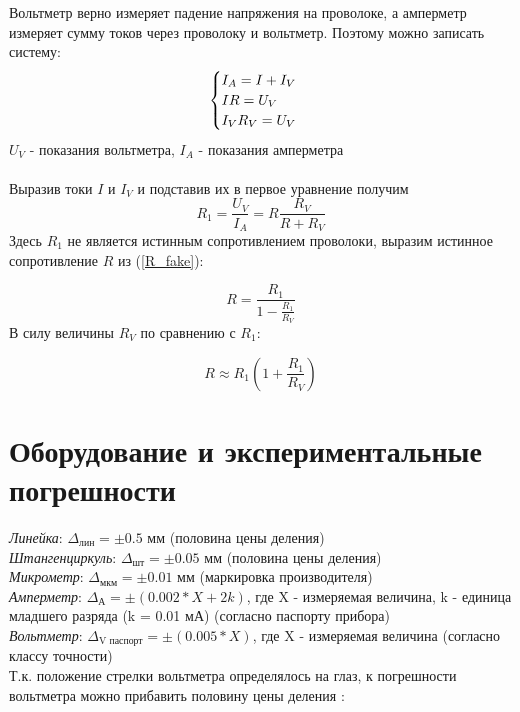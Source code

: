 \documentclass{article}
\begin{document}
	Вольтметр верно измеряет падение напряжения на проволоке, а амперметр измеряет сумму токов через проволоку и вольтметр. Поэтому можно записать систему:\\
	\begin{equation}
		\begin{cases}
			$$ I_{A} = I + I_{V} $$\\
			$$IR = U_{V} $$\\
			$$I_{V}R_{V} = U_{V} $$
		\end{cases} 
	\end{equation}
	$U_{V}$ - показания вольтметра, $I_{A}$ - показания амперметра\\\\
	Выразив токи $I$ и $I_{V}$ и подставив их в первое уравнение получим\\
	\begin{equation}
		\label{R_fake}
		R_{\text{1}} = \frac{U_{V}}{I_{A}}= R\frac{R_{V}}{R+R_{V}}
	\end{equation}
	Здесь $R_{1}$ не является истинным сопротивлением проволоки, выразим истинное сопротивление $R$ из (\ref{R_fake}):
	
	$$R = \frac{R_{1}}{1 - \frac{R_{1}}{R_{V}}}$$
	В силу величины $R_{V}$ по сравнению с $R_{1}$:
	
	\begin{equation}
		R \approx R_{1}(1 + \frac{R_{1}}{R_{V}})
	\end{equation}
	
	
	
	\section{Оборудование и экспериментальные погрешности}
	
	\emph{Линейка}: $\Delta_{\text{лин}} = \pm 0.5$ мм (половина цены деления)\\
	\emph{Штангенциркуль}: $\Delta_{\text{шт}} = \pm 0.05$ мм (половина цены деления)\\
	\emph{Микрометр}: $\Delta_{\text{мкм}} = \pm 0.01$ мм (маркировка производителя)\\
	\emph{Амперметр}: $\Delta_{\text{А}} = \pm (0.002 * X + 2k)$, где X - измеряемая величина, k - единица младшего разряда (k = 0.01 мА) (согласно паспорту прибора)\\
	\emph{Вольтметр}: $\Delta_{\text{V паспорт}} = \pm (0.005 * X)$, где X - измеряемая величина (согласно классу точности)\\
	Т.к. положение стрелки вольтметра определялось на глаз, к погрешности вольтметра можно прибавить половину цены деления :\\
	
\end{document}
